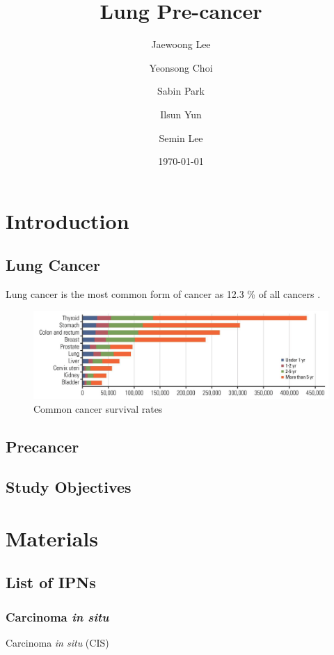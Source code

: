 \documentclass[a4paper]{article}
\title{Lung Pre-cancer}
\author{
    Jaewoong Lee
    \and
    Yeonsong Choi
    \and
    Sabin Park
    \and
    Ilsun Yun
    \and
    Semin Lee
}
\date{\today}
\begin{document}
    \maketitle
    \newpage

    \tableofcontents
    \listoftables
    \listoffigures
    \newpage

    \section{Introduction}
        \subsection{Lung Cancer}
            Lung cancer is the most common form of cancer as 12.3 \% of all cancers \cite{lung3}.

            \begin{figure}[ht]
                \centering
                \includegraphics[width=0.8 \linewidth]{figures/LungCancer/rate.png}
                \caption{Common cancer survival rates \protect\cite{lung6}}
                \label{fig:cancer-survival}
            \end{figure}

        \subsection{Precancer}

        \subsection{Study Objectives}

    \section{Materials}
        \subsection{List of IPNs}
            \subsubsection{Carcinoma \textit{in situ}}
                Carcinoma \textit{in situ} (CIS)
\end{document}
